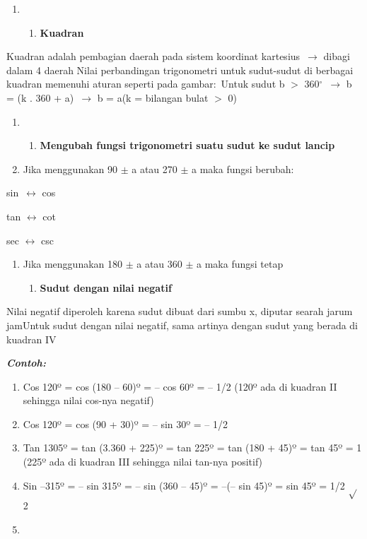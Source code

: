 \documentclass[11pt,fleqn]{book} %
\begin{document}
\textbf{}

\begin{enumerate}
\item \begin{enumerate}
\item \textbf{ Kuadran}
\end{enumerate}
\end{enumerate}

Kuadran adalah pembagian daerah pada sistem koordinat kartesius~$\mathrm{\to}$ dibagi dalam 4 daerah Nilai perbandingan trigonometri untuk sudut-sudut di berbagai kuadran memenuhi aturan seperti pada gambar:~Untuk sudut b $>$ 360${}^\circ$~$\mathrm{\to}$ b = (k . 360 + a)~$\mathrm{\to}$ b = a(k = bilangan bulat $>$ 0)\textbf{}

\begin{enumerate}
\item \begin{enumerate}
\item \textbf{ Mengubah fungsi trigonometri suatu sudut ke sudut lancip}
\end{enumerate}

\item  Jika menggunakan 90 $\pm$ a atau 270 $\pm$ a maka fungsi berubah:
\end{enumerate}

\noindent sin~$\mathrm{\leftrightarrow}$ cos

\noindent tan $\mathrm{\leftrightarrow}$ cot

\noindent sec $\mathrm{\leftrightarrow}$ csc

\begin{enumerate}
\item  Jika menggunakan 180 $\pm$ a atau 360 $\pm$ a maka fungsi tetap

\begin{enumerate}
\item  \textbf{Sudut dengan nilai negatif}
\end{enumerate}
\end{enumerate}

  Nilai negatif diperoleh karena sudut dibuat dari sumbu x, diputar searah jarum jamUntuk sudut dengan nilai negatif, sama artinya dengan sudut yang berada di kuadran IV

\noindent \textbf{\textit{Contoh:}}

\begin{enumerate}
\item  Cos 120º = cos (180 -- 60)º = -- cos 60º = -- 1/2 (120º ada di kuadran II sehingga nilai cos-nya negatif)

\item  Cos 120º = cos (90 + 30)º = -- sin 30º = -- 1/2

\item  Tan 1305º = tan (3.360 + 225)º = tan 225º = tan (180 + 45)º = tan 45º = 1 (225º ada di kuadran III sehingga nilai tan-nya positif)

\item  Sin --315º = -- sin 315º = -- sin (360 -- 45)º = --(-- sin 45)º = sin 45º = 1/2 $\mathrm{\sqrt{}}$2

\item  
\end{enumerate}
\end{document}
